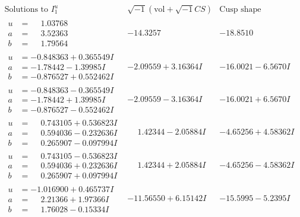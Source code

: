 \documentclass[1p]{elsarticle_modified}
\theoremstyle{definition}
\newcommand{\I}{\sqrt{-1}}
\begin{document}
$$\begin{array}{c|c|c}  
\text{Solutions to }I^u_{1}& \I (\text{vol} + \sqrt{-1}CS) & \text{Cusp shape}\\
 \hline 
\begin{aligned}
u &= \phantom{-}1.03768\phantom{ +0.000000I} \\
a &= \phantom{-}3.52363\phantom{ +0.000000I} \\
b &= \phantom{-}1.79564\phantom{ +0.000000I}\end{aligned}
 & -14.3257\phantom{ +0.000000I} & -18.8510\phantom{ +0.000000I} \\ \hline\begin{aligned}
u &= -0.848363 + 0.365549 I \\
a &= -1.78442 - 1.39985 I \\
b &= -0.876527 + 0.552462 I\end{aligned}
 & -2.09559 + 3.16364 I & -16.0021 - 6.5670 I \\ \hline\begin{aligned}
u &= -0.848363 - 0.365549 I \\
a &= -1.78442 + 1.39985 I \\
b &= -0.876527 - 0.552462 I\end{aligned}
 & -2.09559 - 3.16364 I & -16.0021 + 6.5670 I \\ \hline\begin{aligned}
u &= \phantom{-}0.743105 + 0.536823 I \\
a &= \phantom{-}0.594036 - 0.232636 I \\
b &= \phantom{-}0.265907 - 0.097994 I\end{aligned}
 & \phantom{-}1.42344 - 2.05884 I & -4.65256 + 4.58362 I \\ \hline\begin{aligned}
u &= \phantom{-}0.743105 - 0.536823 I \\
a &= \phantom{-}0.594036 + 0.232636 I \\
b &= \phantom{-}0.265907 + 0.097994 I\end{aligned}
 & \phantom{-}1.42344 + 2.05884 I & -4.65256 - 4.58362 I \\ \hline\begin{aligned}
u &= -1.016900 + 0.465737 I \\
a &= \phantom{-}2.21366 + 1.97366 I \\
b &= \phantom{-}1.76028 - 0.15334 I\end{aligned}
 & -11.56550 + 6.15142 I & -15.5995 - 5.2395 I \\ \hline\begin{aligned}

\end{aligned}
\end{array}$$
\end{document}
